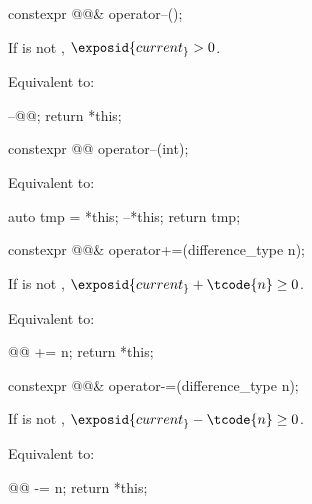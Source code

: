 %
\begin{itemdecl}
constexpr @@& operator--();
\end{itemdecl}

\begin{itemdescr}
\pnum
\expects
If  is not ,
$\exposid{current_} > 0$.

\pnum
\effects
Equivalent to:
\begin{codeblock}
--@@;
return *this;
\end{codeblock}
\end{itemdescr}

%
\begin{itemdecl}
constexpr @@ operator--(int);
\end{itemdecl}

\begin{itemdescr}
\pnum
\effects
Equivalent to:
\begin{codeblock}
auto tmp = *this;
--*this;
return tmp;
\end{codeblock}
\end{itemdescr}

%
\begin{itemdecl}
constexpr @@& operator+=(difference_type n);
\end{itemdecl}

\begin{itemdescr}
\pnum
\expects
If  is not ,
$\exposid{current_} + \tcode{n} \ge 0$.

\pnum
\effects
Equivalent to:
\begin{codeblock}
@@ += n;
return *this;
\end{codeblock}
\end{itemdescr}

%
\begin{itemdecl}
constexpr @@& operator-=(difference_type n);
\end{itemdecl}

\begin{itemdescr}
\pnum
\expects
If  is not ,
$\exposid{current_} - \tcode{n} \ge 0$.

\pnum
\effects
Equivalent to:
\begin{codeblock}
@@ -= n;
return *this;
\end{codeblock}
\end{itemdescr}

